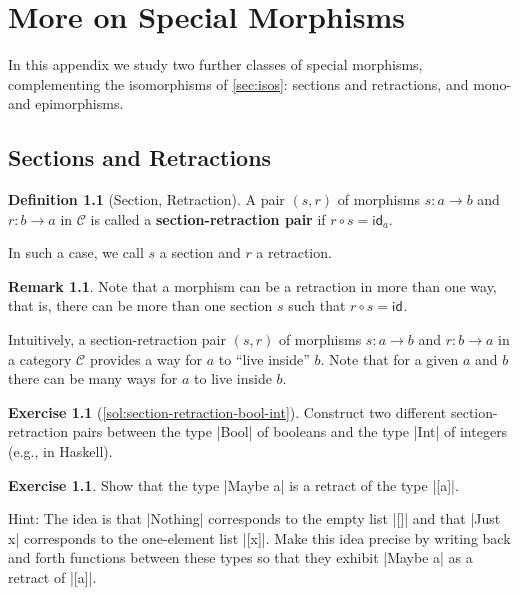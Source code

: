 \documentclass[a4paper,11pt, oneside,titlepage=false]{scrbook}
\theoremstyle{plain}
\theoremstyle{definition}
\newtheorem{rem}[thm]{Remark}
\newtheorem{dfn}[thm]{Definition}
\newtheorem{exer}[thm]{Exercise}
\newcommand{\cfont}[1]{\ensuremath{\mathsf{#1}}}
\newcommand{\Cat}[1]{\mathcal{#1}}
\newcommand{\CC}{\Cat{C}}
\newcommand{\Id}[1][]{\cfont{id}_{#1}}
\newcommand{\co}[2]{\ensuremath{#2 \circ #1}}
\begin{document}
\appendix


\chapter{More on Special Morphisms}
\label{ch:more-special-morphisms}

In this appendix we study two further classes of special morphisms, complementing the isomorphisms of \cref{sec:isos}: sections and retractions, and mono- and epimorphisms.

\section{Sections and Retractions}
\label{sec:sections}


\begin{dfn}[Section, Retraction]
  A pair $(s,r)$ of morphisms $s : a \to b$ and $r : b \to a$ in $\CC$ is called a \textbf{section-retraction pair} if $\co{s}{r} = \Id[a]$.

  In such a case, we call $s$ a section and $r$ a retraction.
\end{dfn}

\begin{rem}
  Note that a morphism can be a retraction in more than one way, that is, there can be more than one section $s$ such that $\co{s}{r} = \Id$.
\end{rem}

Intuitively, a section-retraction pair $(s,r)$ of morphisms $s : a \to b$ and $r : b \to a$ in a category $\CC$ provides a way for $a$ to ``live inside'' $b$.
Note that for a given $a$ and $b$ there can be many ways for $a$ to live inside $b$.

\begin{exer}[\cref{sol:section-retraction-bool-int}]\label{exer:section-retraction-bool-int}
  Construct two different section-retraction pairs between the type |Bool| of booleans and the type |Int| of integers (e.g., in Haskell).
\end{exer}



\begin{exer}
 Show that the type |Maybe a| is a retract of the type |[a]|.

 Hint: The idea is that |Nothing| corresponds to the empty list |[]| and that |Just x| corresponds to the one-element list |[x]|. Make this idea precise by writing back and forth functions between these types so that they exhibit |Maybe a| as a retract of |[a]|.
\end{exer}
\end{document}
